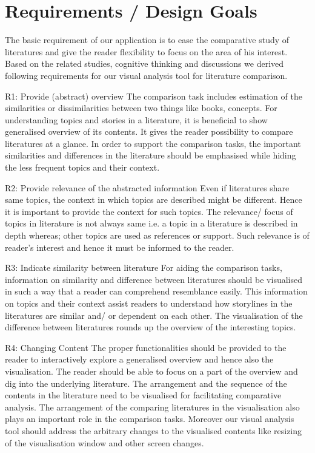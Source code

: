 \chapter{Requirements / Design Goals}
\label{requirements}

The basic requirement of our application is to ease the comparative study of literatures and give the reader flexibility to focus on the area of his interest. Based on the related studies, cognitive thinking and discussions we derived following requirements for our visual analysis tool for literature comparison.

R1: Provide (abstract) overview
The comparison task includes estimation of the similarities or dissimilarities between two things like books, concepts. For understanding topics and stories in a literature, it is beneficial to show generalised overview of its contents. It gives the reader possibility to compare literatures at a glance. In order to support the comparison tasks, the important similarities and differences in the literature should be emphasised while hiding the less frequent topics and their context.

R2: Provide relevance of the abstracted information
Even if literatures share same topics, the context in which topics are described might be different. Hence it is important to provide the context for such topics. The relevance/ focus of topics in literature is not always same i.e. a topic in a literature is described in depth whereas; other topics are used as references or support. Such relevance is of reader's interest and hence it must be informed to the reader.

R3: Indicate similarity between literature
For aiding the comparison tasks, information on similarity and difference between literatures should be visualised in such a way that a reader can comprehend resemblance easily. This information on topics and their context assist readers to understand how storylines in the literatures are similar and/ or dependent on each other. The visualisation of the difference between literatures rounds up the overview of the interesting topics.

R4: Changing Content
 The proper functionalities should be provided to the reader to interactively explore a generalised overview and hence also the visualisation. The reader should be able to focus on a part of the overview and dig into the underlying literature. The arrangement and the sequence of the contents in the literature need to be visualised for facilitating comparative analysis. The arrangement of the comparing literatures in the visualisation also plays an important role in the comparison tasks. Moreover our visual analysis tool should address the arbitrary changes to the visualised contents like resizing of the visualisation window and other screen changes.

